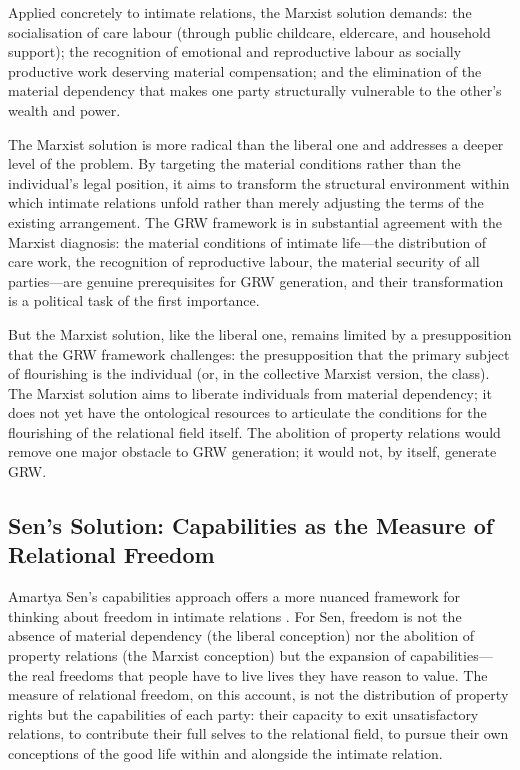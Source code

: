 Applied concretely to intimate relations, the Marxist solution demands: the socialisation of care labour (through public childcare, eldercare, and household support); the recognition of emotional and reproductive labour as socially productive work deserving material compensation; and the elimination of the material dependency that makes one party structurally vulnerable to the other's wealth and power.

The Marxist solution is more radical than the liberal one and addresses a deeper level of the problem. By targeting the material conditions rather than the individual's legal position, it aims to transform the structural environment within which intimate relations unfold rather than merely adjusting the terms of the existing arrangement. The GRW framework is in substantial agreement with the Marxist diagnosis: the material conditions of intimate life---the distribution of care work, the recognition of reproductive labour, the material security of all parties---are genuine prerequisites for GRW generation, and their transformation is a political task of the first importance.

But the Marxist solution, like the liberal one, remains limited by a presupposition that the GRW framework challenges: the presupposition that the primary subject of flourishing is the individual (or, in the collective Marxist version, the class). The Marxist solution aims to liberate individuals from material dependency; it does not yet have the ontological resources to articulate the conditions for the flourishing of the relational field itself. The abolition of property relations would remove one major obstacle to GRW generation; it would not, by itself, generate GRW.

\subsection{Sen's Solution: Capabilities as the Measure of Relational Freedom}
\label{p15:subsec:sen_solution}

\noindent
Amartya Sen's capabilities approach offers a more nuanced framework for thinking about freedom in intimate relations \parencite{sen1999}. For Sen, freedom is not the absence of material dependency (the liberal conception) nor the abolition of property relations (the Marxist conception) but the expansion of capabilities---the real freedoms that people have to live lives they have reason to value. The measure of relational freedom, on this account, is not the distribution of property rights but the capabilities of each party: their capacity to exit unsatisfactory relations, to contribute their full selves to the relational field, to pursue their own conceptions of the good life within and alongside the intimate relation.

